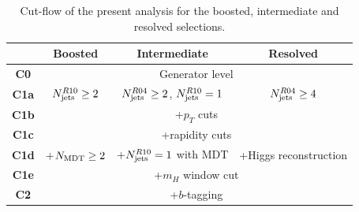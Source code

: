 \begin{table}[t]
  \centering
  \begin{tabular}{|c|c|c|c|}
\hline
&  Boosted  &   Intermediate &  Resolved  \\
\hline
\hline
{\bf C0} &  \multicolumn{3}{c|}{Generator level} \\
\hline
{\bf C1a} & $N_{\rm jets}^{R10}\ge 2$ & $N_{\rm jets}^{R04}\ge 2$, $N_{\rm jets}^{R10}=1$  &
$N_{\rm jets}^{R04}\ge 4$ \\
\hline
{\bf  C1b} & \multicolumn{3}{c|}{+$p_T$ cuts} \\
{\bf C1c} & \multicolumn{3}{c|}{+rapidity cuts}\\
\hline
 {\bf C1d} & +$N_{\rm MDT}\ge 2$ & +$N_{\rm jets}^{R10}=1$ with MDT  &
 +Higgs reconstruction \\
 \hline
{\bf C1e} & \multicolumn{3}{c|}{ +$m_H$ window cut} \\
\hline
{\bf C2} & \multicolumn{3}{c|}{+$b$-tagging}    \\
\hline
  \end{tabular}
  \caption{\small Cut-flow of the present analysis for the boosted, intermediate
    and resolved selections.
      \label{tab:cutflowdetails}
  }
\end{table}


